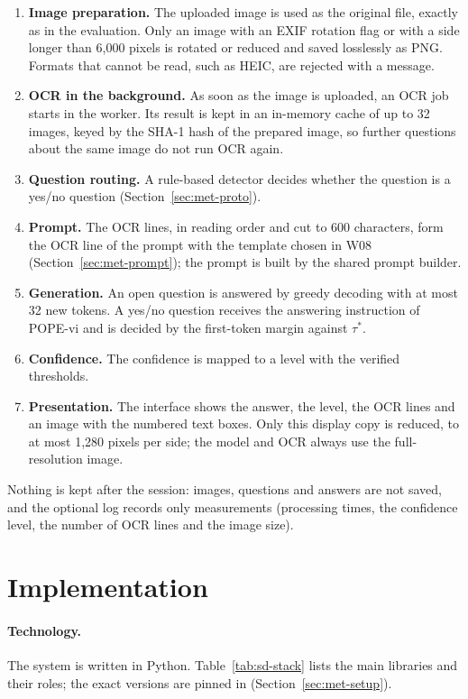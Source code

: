 \begin{enumerate}
  \item \textbf{Image preparation.} The uploaded image is used as the original file, exactly
  as in the evaluation. Only an image with an EXIF rotation flag or with a side longer than
  6,000 pixels is rotated or reduced and saved losslessly as PNG. Formats that cannot be read,
  such as HEIC, are rejected with a message.
  \item \textbf{OCR in the background.} As soon as the image is uploaded, an OCR job starts in
  the worker. Its result is kept in an in-memory cache of up to 32 images, keyed by the SHA-1
  hash of the prepared image, so further questions about the same image do not run OCR again.
  \item \textbf{Question routing.} A rule-based detector decides whether the question is a
  yes/no question (Section~\ref{sec:met-proto}).
  \item \textbf{Prompt.} The OCR lines, in reading order and cut to 600 characters, form the
  OCR line of the prompt with the template chosen in W08 (Section~\ref{sec:met-prompt}); the
  prompt is built by the shared prompt builder.
  \item \textbf{Generation.} An open question is answered by greedy decoding with at most 32
  new tokens. A yes/no question receives the answering instruction of POPE-vi and is decided
  by the first-token margin against $\tau^*$.
  \item \textbf{Confidence.} The confidence is mapped to a level with the verified thresholds.
  \item \textbf{Presentation.} The interface shows the answer, the level, the OCR lines and an
  image with the numbered text boxes. Only this display copy is reduced, to at most 1,280
  pixels per side; the model and OCR always use the full-resolution image.
\end{enumerate}

Nothing is kept after the session: images, questions and answers are not saved, and the
optional log records only measurements (processing times, the confidence level, the number
of OCR lines and the image size).

\section{Implementation}
\label{sec:sd-impl}

\paragraph{Technology.} The system is written in Python. Table~\ref{tab:sd-stack} lists the
main libraries and their roles; the exact versions are pinned in 
(Section~\ref{sec:met-setup}).

